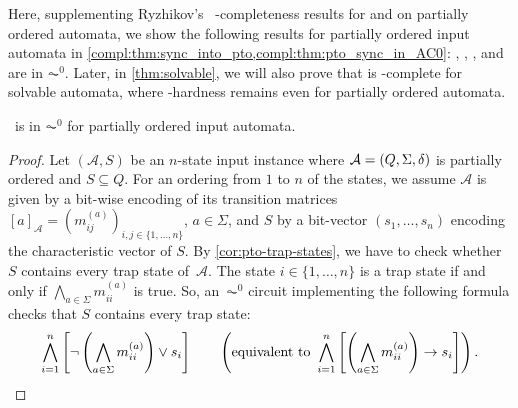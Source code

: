 



Here, supplementing Ryzhikov's~\cite[Prop.~9 \& Thm.~4]{Ryzhikov19a} \NP-completeness results for \DFAINT and \SFS on partially ordered automata, 
we show the following results for partially ordered input automata in \cref{compl:thm:sync_into_pto,compl:thm:pto_sync_in_AC0}:
\SIS, \DFAS, \DFAST, and \DFASS  are in $\AC^0$. Later, in \cref{thm:solvable}, we will also prove that \ST is \NP-complete for solvable automata,
where \NP-hardness remains even for partially ordered automata.

\begin{theorem}
	\label{compl:thm:sync_into_pto}
	\SIS\  is in $\AC^0$ for partially ordered input automata.
\end{theorem}
\begin{proof}
	Let $(\mathcal A, S)$ be an $n$-state input instance where $\mathcal A = (Q, \Sigma, \delta)$ is partially ordered and $S \subseteq Q$.
	For an ordering from $1$ to $n$ of the states, 
	we assume $\mathcal A$ is given by a bit-wise encoding of its  transition matrices $[a]_{\mathcal A} 
	= (m^{(a)}_{ij})_{i,j \in \{1,\ldots,n\}}$, $a \in \Sigma$,
	and $S$ by a bit-vector $(s_1, \ldots, s_n)$ encoding the characteristic vector of $S$.	
	By \cref{cor:pto-trap-states},
	we have to check whether~$S$ contains every trap state of~$\mathcal A$.
	The state $i \in \{1,\ldots,n\}$
	is a trap state if and only if $\bigwedge_{a \in \Sigma} m_{ii}^{(a)}$
	is true. So, an~$\AC^0$ circuit implementing the following formula
	checks that $S$ contains every trap state:
	\[
	\bigwedge_{i=1}^n \left[ \neg \left( \bigwedge_{a \in \Sigma} m^{(a)}_{ii} \right) \lor s_i \right] \qquad
	\left( \text{equivalent to } 	\bigwedge_{i=1}^n \left[ \left( \bigwedge_{a \in \Sigma} m^{(a)}_{ii} \right) \rightarrow s_i \right]  \right).
	\qedhere
	\]
\end{proof}


